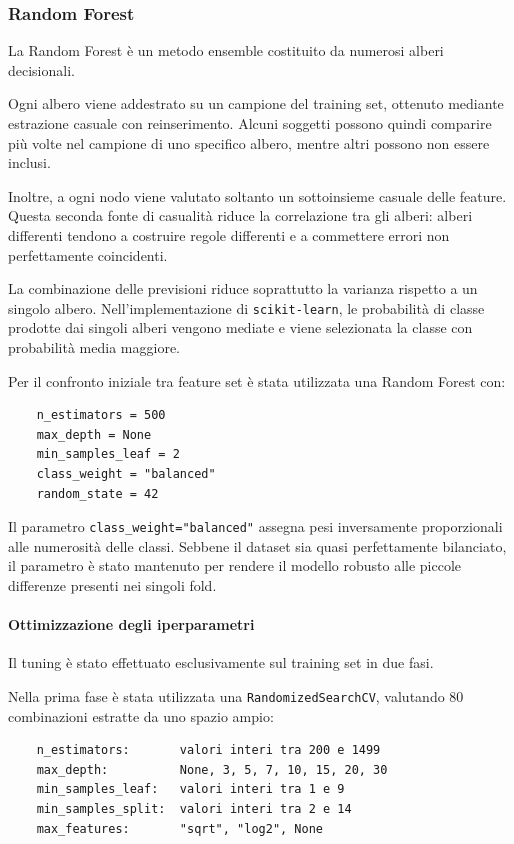 \subsubsection{Random Forest}

La Random Forest è un metodo ensemble costituito da numerosi alberi
decisionali.

Ogni albero viene addestrato su un campione del training
set, ottenuto mediante estrazione casuale con reinserimento. Alcuni
soggetti possono quindi comparire più volte nel campione di uno
specifico albero, mentre altri possono non essere inclusi.

Inoltre, a ogni nodo viene valutato soltanto un sottoinsieme casuale
delle feature. Questa seconda fonte di casualità riduce la
correlazione tra gli alberi: alberi differenti tendono a costruire
regole differenti e a commettere errori non perfettamente coincidenti.

La combinazione delle previsioni riduce soprattutto la varianza
rispetto a un singolo albero. Nell'implementazione di
\texttt{scikit-learn}, le probabilità di classe prodotte dai singoli
alberi vengono mediate e viene selezionata la classe con probabilità
media maggiore.

Per il confronto iniziale tra feature set è stata utilizzata una
Random Forest con:

\begin{verbatim}
	n_estimators = 500
	max_depth = None
	min_samples_leaf = 2
	class_weight = "balanced"
	random_state = 42
\end{verbatim}

Il parametro \texttt{class\_weight="balanced"} assegna pesi
inversamente proporzionali alle numerosità delle classi. Sebbene il
dataset sia quasi perfettamente bilanciato, il parametro è stato
mantenuto per rendere il modello robusto alle piccole differenze
presenti nei singoli fold.


\paragraph{Ottimizzazione degli iperparametri}

Il tuning è stato effettuato esclusivamente sul training set in due
fasi.

Nella prima fase è stata utilizzata una
\texttt{RandomizedSearchCV}, valutando 80 combinazioni estratte da uno
spazio ampio:

\begin{verbatim}
	n_estimators:       valori interi tra 200 e 1499
	max_depth:          None, 3, 5, 7, 10, 15, 20, 30
	min_samples_leaf:   valori interi tra 1 e 9
	min_samples_split:  valori interi tra 2 e 14
	max_features:       "sqrt", "log2", None
\end{verbatim}


